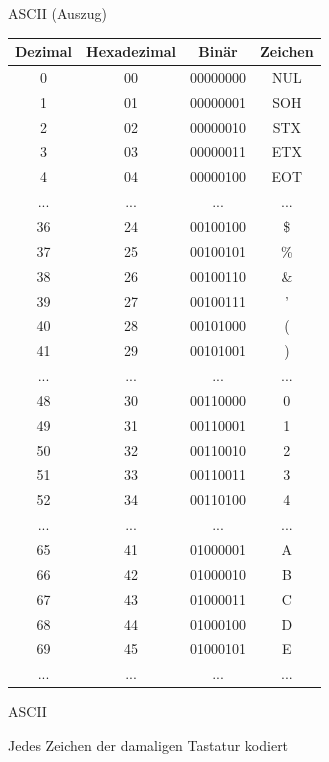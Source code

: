 \begin{frame}[fragile]{\gls{ASCII} (Auszug)}
\begin{table}[H]
	\centering
	\tiny
	\begin{tabular}{cccc}
		\toprule
		Dezimal & Hexadezimal & Binär & Zeichen \\
		\midrule
		0 & 00 & 00000000 & NUL \\
		1 & 01 & 00000001 & SOH \\
		2 & 02 & 00000010 & STX \\
		3 & 03 & 00000011 & ETX \\
		4 & 04 & 00000100 & EOT \\\midrule
		... & ... & ... & ... \\\midrule
		36 & 24 & 00100100 & \$ \\
		37 & 25 & 00100101 & \% \\
		38 & 26 & 00100110 & \& \\
		39 & 27 & 00100111 & ' \\
		40 & 28 & 00101000 & ( \\
		41 & 29 & 00101001 & ) \\\midrule
		... & ... & ... & ... \\\midrule
		48 & 30 & 00110000 & 0 \\
		49 & 31 & 00110001 & 1 \\
		50 & 32 & 00110010 & 2 \\
		51 & 33 & 00110011 & 3 \\
		52 & 34 & 00110100 & 4 \\\midrule
		... & ... & ... & ... \\\midrule
		65 & 41 & 01000001 & A \\
		66 & 42 & 01000010 & B \\
		67 & 43 & 01000011 & C \\
		68 & 44 & 01000100 & D \\
		69 & 45 & 01000101 & E \\\midrule
		... & ... & ... & ... \\\bottomrule
	\end{tabular}
\end{table}
\end{frame}

\begin{frame}[fragile]{ \gls{ASCII}}
	\begin{center}
		Jedes Zeichen der damaligen Tastatur kodiert
	\end{center}
\end{frame}

